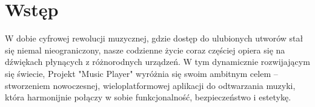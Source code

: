 ﻿\chapter*{Wstęp}


W dobie cyfrowej rewolucji muzycznej, gdzie dostęp do ulubionych utworów stał się niemal nieograniczony, nasze codzienne życie coraz częściej opiera się na dźwiękach płynących z różnorodnych urządzeń. W tym dynamicznie rozwijającym się świecie, Projekt "Music Player" wyróżnia się swoim ambitnym celem – stworzeniem nowoczesnej, wieloplatformowej aplikacji do odtwarzania muzyki, która harmonijnie połączy w sobie funkcjonalność, bezpieczeństwo i estetykę.

